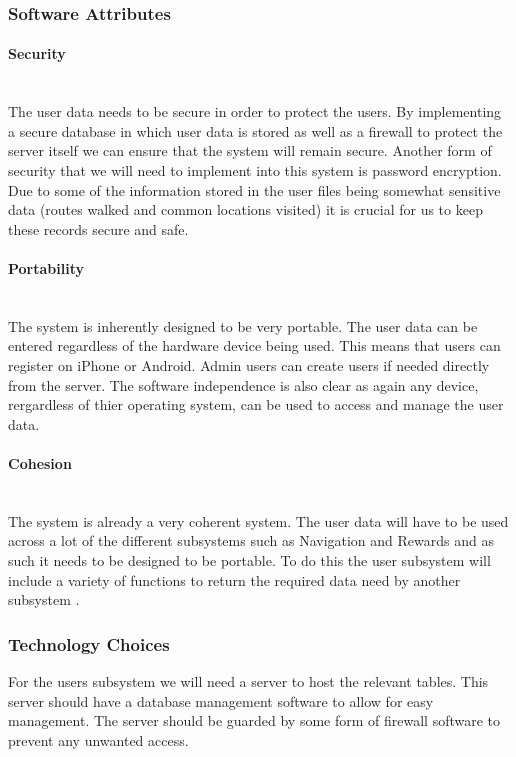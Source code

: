 \subsubsection{Software Attributes}
\paragraph{Security}
\mbox{}\\
The user data needs to be secure in order to protect the users. By implementing a secure database in which user data is stored as well as a firewall to protect the server itself we can ensure that the system will remain secure. Another form of security that we will need to implement into this system is password encryption. Due to some of the information stored in the user files being somewhat sensitive data (routes walked and common locations visited) it is crucial for us to keep these records secure and safe.

\paragraph{Portability}
\mbox{}\\
The system is inherently designed to be very portable. The user data can be entered regardless of the hardware device being used. This means that users can register on iPhone or Android. Admin users can create users if needed directly from the server. The software independence is also clear as again any device,  rergardless of thier operating system, can be used to access and manage the user data. 

\paragraph{Cohesion}
\mbox{}\\
The system is already a very coherent system. The user data will have to be used across a lot of the different subsystems such as Navigation and Rewards and as such it needs to be designed to be portable. To do this the user subsystem will include a variety of functions to return the required data need by another subsystem . 

\subsubsection{Technology Choices}
For the users subsystem we will need a server to host the relevant tables. This server should have a database management software to allow for easy management. The server should be 
guarded by some form of firewall software to prevent any unwanted access. 

